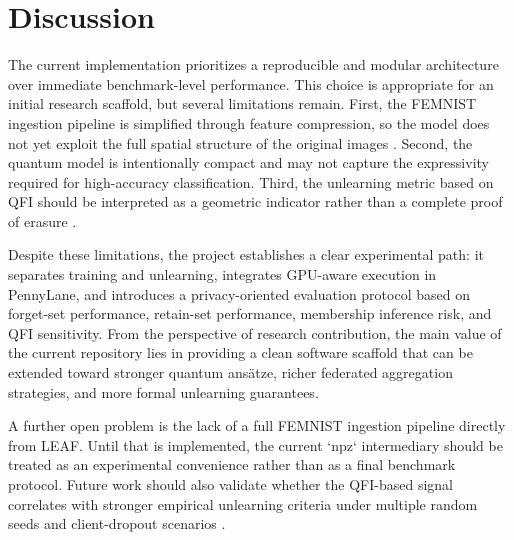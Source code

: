 \section{Discussion}
\label{sec:discussion}

The current implementation prioritizes a reproducible and modular architecture over immediate benchmark-level performance. This choice is appropriate for an initial research scaffold, but several limitations remain. First, the FEMNIST ingestion pipeline is simplified through feature compression, so the model does not yet exploit the full spatial structure of the original images \cite{leaf}. Second, the quantum model is intentionally compact and may not capture the expressivity required for high-accuracy classification. Third, the unlearning metric based on QFI should be interpreted as a geometric indicator rather than a complete proof of erasure \cite{qfi,unlearning_survey_2024}.

Despite these limitations, the project establishes a clear experimental path: it separates training and unlearning, integrates GPU-aware execution in PennyLane, and introduces a privacy-oriented evaluation protocol based on forget-set performance, retain-set performance, membership inference risk, and QFI sensitivity. From the perspective of research contribution, the main value of the current repository lies in providing a clean software scaffold that can be extended toward stronger quantum ansätze, richer federated aggregation strategies, and more formal unlearning guarantees.

A further open problem is the lack of a full FEMNIST ingestion pipeline directly from LEAF. Until that is implemented, the current `npz` intermediary should be treated as an experimental convenience rather than as a final benchmark protocol. Future work should also validate whether the QFI-based signal correlates with stronger empirical unlearning criteria under multiple random seeds and client-dropout scenarios \cite{federated_unlearning_active_forgetting,forgettable_federated_linear_learning,qfl_foundations_2023}.
